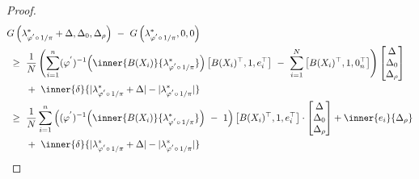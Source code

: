 \begin{proof}
\begin{align*}
  &
  G
   \left( 
\lambda^*_{\varphi^{'}\circ\,1/\pi}
+\Delta
,
\Delta_0
,
\Delta_\rho
   \right)
   \ 
   -
   \ 
   G
   \left(
\lambda^*_{\varphi^{'}\circ\,1/\pi}
,0,0
   \right)
   \\
   &
   \ 
   \ge
   \ 
   \frac{1}{N}
  \left( 
\sum_{i=1} 
  ^n
  (
  \varphi^{'}
  )
  ^{-1}
  \!
  \left( 
\inner
{B(X_i)}
{
\lambda^*_{\varphi^{'}\circ\,1/\pi}
}
  \right)
  \left[ 
    B(X_i)^\top,1,e_i^\top
  \right]
  \ 
  -
  \ 
  \sum_{i=1}^{N} 
  \left[ 
    B(X_i)^\top,1,0_n^\top
  \right]
  \right)
  \begin{bmatrix}
    \Delta
    \\
    \Delta_0
    \\
    \Delta_\rho
  \end{bmatrix}
    \\
  &
  \qquad
  +
  \ 
  \inner{\delta}
  {|
\lambda^*_{\varphi^{'}\circ\,1/\pi}
+
\Delta
  |
  -
  |
\lambda^*_{\varphi^{'}\circ\,1/\pi}
  |
}
\\
   &
   \ 
   \ge
   \ 
   \frac{1}{N}
\sum_{i=1} 
  ^n
  \left( 
  (
  \varphi^{'}
  )
  ^{-1}
  \!
  \left( 
\inner
{B(X_i)}
{
\lambda^*_{\varphi^{'}\circ\,1/\pi}
}
  \right)
  \ 
  -
  \ 
  1
  \right)
  \left[ 
    B(X_i)^\top,1,e_i^\top
  \right]
  \cdot
  \begin{bmatrix}
    \Delta
    \\
    \Delta_0
    \\
    \Delta_\rho
  \end{bmatrix}
  +
  \inner{e_i}{\Delta_\rho}
  \\
  &
  \qquad
  +
  \ 
  \inner{\delta}
  {|
\lambda^*_{\varphi^{'}\circ\,1/\pi}
+
\Delta
  |
  -
  |
\lambda^*_{\varphi^{'}\circ\,1/\pi}
  |
}
\end{align*}
 \end{proof}

